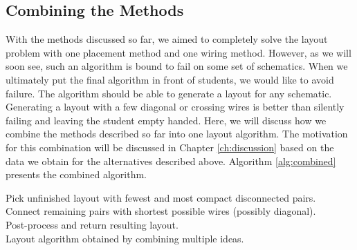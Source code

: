 \subsection{Combining the Methods}
\label{sec:combined_alg}

With the methods discussed so far, we aimed to completely solve the layout problem
with one placement method and one wiring method. However, as we will soon see,
such an algorithm is bound to fail on some set of schematics. When we ultimately
put the final algorithm in front of students, we would like to avoid failure.
The algorithm should be able to generate a layout for any schematic.
Generating a layout
with a few diagonal or crossing wires is better than silently failing and leaving
the student empty handed. Here, we will discuss how we combine the methods
described so far into one layout algorithm. The motivation for this combination
will be discussed in Chapter \ref{ch:discussion} based on the data we obtain
for the alternatives described above. Algorithm \ref{alg:combined} presents the
combined algorithm.

\begin{algorithm}
\BlankLine
{}
Pick unfinished layout with fewest and most compact disconnected pairs.\\
Connect remaining pairs with shortest possible wires (possibly diagonal).\\
Post-process and return resulting layout.\\
\caption{Layout algorithm obtained by combining multiple ideas.}
\label{alg:combined}
\end{algorithm}

